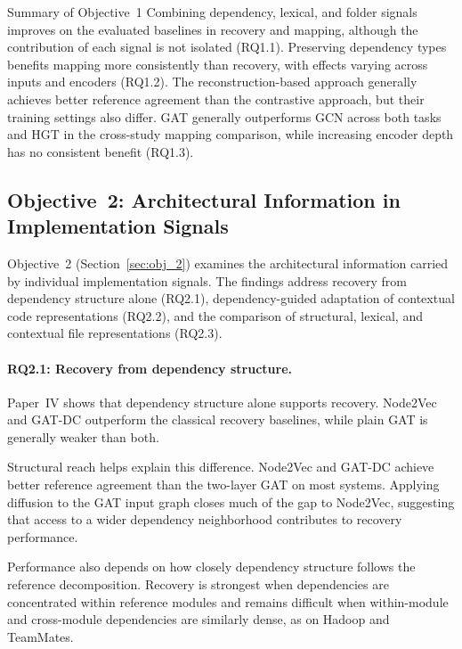 \begin{GrayBox}{Summary of Objective~1}
Combining dependency, lexical, and folder signals improves on the evaluated baselines in recovery and mapping, although the contribution of each signal is not isolated (RQ1.1). Preserving dependency types benefits mapping more consistently than recovery, with effects varying across inputs and encoders (RQ1.2). The reconstruction-based approach generally achieves better reference agreement than the contrastive approach, but their training settings also differ. GAT generally outperforms GCN across both tasks and HGT in the cross-study mapping comparison, while increasing encoder depth has no consistent benefit (RQ1.3).
\end{GrayBox}

\subsection{Objective~2: Architectural Information in Implementation Signals \label{sec:cont_2}}

Objective~2 (Section~\ref{sec:obj_2}) examines the architectural information carried by individual implementation signals. The findings address recovery from dependency structure alone (RQ2.1), dependency-guided adaptation of contextual code representations (RQ2.2), and the comparison of structural, lexical, and contextual file representations (RQ2.3).

\paragraph{RQ2.1: Recovery from dependency structure.} Paper~IV shows that dependency structure alone supports recovery. Node2Vec and GAT-DC outperform the classical recovery baselines, while plain GAT is generally weaker than both.

Structural reach helps explain this difference. Node2Vec and GAT-DC achieve better reference agreement than the two-layer GAT on most systems. Applying diffusion to the GAT input graph closes much of the gap to Node2Vec, suggesting that access to a wider dependency neighborhood contributes to recovery performance.

Performance also depends on how closely dependency structure follows the reference decomposition. Recovery is strongest when dependencies are concentrated within reference modules and remains difficult when within-module and cross-module dependencies are similarly dense, as on Hadoop and TeamMates.

